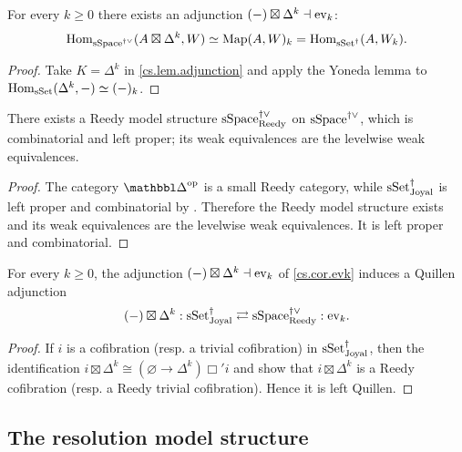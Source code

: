 \documentclass[a4paper,dvipdfmx,11pt]{amsart}
\begin{document}
\begin{corollary}\label{cs.cor.evk}
  For every $k\geq0$ there exists an adjunction $(-)\boxtimes\Delta^k\dashv\mathrm{ev}_k$:
  \begin{align}
    \operatorname{Hom}_{\mathrm{sSpace}^{\dag\vee}}(A\boxtimes\Delta^k,W)
    \simeq
    \operatorname{Map}(A,W)_k
    =
    \operatorname{Hom}_{\mathrm{sSet}^{\dag}}(A,W_k).
  \end{align}
\end{corollary}

\begin{proof}
  Take $K=\Delta^k$ in \cref{cs.lem.adjunction} and apply the Yoneda lemma to $\operatorname{Hom}_{\mathrm{sSet}}(\Delta^k,-) \simeq (-)_k$.
\end{proof}

\begin{lemma}\label{cs.lem.reedy}
  There exists a Reedy model structure $\mathrm{sSpace}^{\dag\vee}_{\mathrm{Reedy}}$ on $\mathrm{sSpace}^{\dag\vee}$, which is combinatorial and left proper;
  its weak equivalences are the levelwise weak equivalences.
\end{lemma}

\begin{proof}
  The category $\prism^{\myop}$ is a small Reedy category, while $\mathrm{sSet}^{\dag}_{\mathrm{Joyal}}$ is left proper and combinatorial by \cite[Theorem~3.5.5]{Aka26}.
  Therefore the Reedy model structure exists and its weak equivalences are the levelwise weak equivalences.
  It is left proper and combinatorial.
\end{proof}

\begin{proposition}\label{cs.lem.evaluation-quillen}
  For every $k\geq0$, the adjunction $(-)\boxtimes\Delta^k\dashv\mathrm{ev}_k$ of \cref{cs.cor.evk} induces a Quillen adjunction
  \begin{align}
    (-)\boxtimes\Delta^k : \mathrm{sSet}^{\dag}_{\mathrm{Joyal}} \rightleftarrows \mathrm{sSpace}^{\dag\vee}_{\mathrm{Reedy}} : \mathrm{ev}_k.
  \end{align}
\end{proposition}

\begin{proof}
  If $i$ is a cofibration (resp. a trivial cofibration) in $\mathrm{sSet}^{\dag}_{\mathrm{Joyal}}$, then the identification $i\boxtimes\Delta^k \cong (\varnothing\to\Delta^k)\mathbin{\Box'}i$ and \cite[Proposition~7.36]{JT06} show that $i\boxtimes\Delta^k$ is a Reedy cofibration (resp. a Reedy trivial cofibration).
  Hence it is left Quillen.
\end{proof}

\subsection{The resolution model structure}
\end{document}
